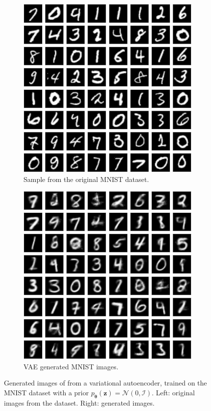 \documentclass[graybox]{svmult}
\newcommand{\mb}[1]{\mathbf{#1}}
\newcommand{\bz}[0]{\mb{z}}
\newcommand{\btheta}[0]{\mb{\theta}}
\begin{document}
\begin{figure}
\centering
\begin{subfigure}{.5\textwidth}
    \centering
  \includegraphics[scale=0.3]{original_MNIST.png}
  \caption{Sample from the original MNIST dataset.}
  \label{subfig:original_MNIST}
\end{subfigure}%
\begin{subfigure}{.5\textwidth}
    \centering
  \includegraphics[scale=0.3]{ae_generated_MNIST.png}
  \caption{VAE generated MNIST images.}
  \label{subfig:ae_generated_MNIST}
\end{subfigure}
\caption{Generated images of from a variational autoencoder, trained on the MNIST dataset with a prior $p_\btheta(\bz)=\mathcal{N}(0,\mathcal{I})$. Left: original images from the dataset. Right: generated images.}
\label{fig:vae_generation_MNIST}
\end{figure}
\end{document}
